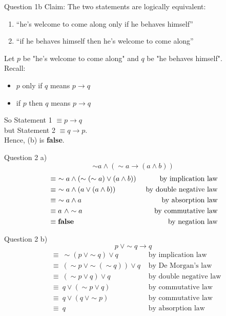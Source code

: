 \documentclass[10pt]{beamer}
\begin{document}
\begin{frame}[fragile]{Question 1b}
    Claim: The two statements are logically equivalent:
    \begin{enumerate}
        \item “he’s welcome to come along only if he behaves himself”
        \item “if he behaves himself then he’s welcome to come along”
    \end{enumerate}
    Let $p$ be "he's welcome to come along" and $q$ be "he behaves himself". \\
    Recall:
    \begin{itemize}
        \item $p$ only if $q$ means $p \rightarrow q$
        \item if $p$ then $q$ means $p \rightarrow q$
    \end{itemize}
    So Statement 1 $\equiv p \rightarrow q$ \\
    but Statement 2 $\equiv q \rightarrow p$. \\
    Hence, (b) is \textbf{false}.
\end{frame}

\begin{frame}[fragile]{Question 2}
a) $$\sim a \land ( \sim a \rightarrow (a \land b))$$
    \begin{align*}
        &\equiv \ \sim a \land ( \sim (\sim a) \lor (a \land b)) &\text{ by implication law} \\
        &\equiv \ \sim a \land ( a \lor (a \land b)) &\text{ by double negative law} \\
        &\equiv \ \sim a \land a &\text{ by absorption law} \\
        &\equiv a \ \land \sim a &\text{ by commutative law} \\
        &\equiv \text{\textbf{false}} &\text{ by negation law} 
    \end{align*}
\end{frame}

\begin{frame}[fragile]{Question 2}
b)
\[p \ \lor \sim q \rightarrow q \]
    \begin{align*}
        &\equiv \ \sim (p \ \lor \sim q) \lor q &\text{ by implication law} \\
        &\equiv \ (\sim p \ \lor \sim (\sim q)) \lor q &\text{ by De Morgan's law} \\
        &\equiv \ (\sim p \lor q) \lor q &\text{ by double negative law} \\
        &\equiv \ q \lor (\sim p \lor q) &\text{ by commutative law} \\
        &\equiv \ q \lor (q \ \lor \sim p) &\text{ by commutative law} \\
        &\equiv \ q &\text{ by absorption law}
    \end{align*}
\end{frame}
\end{document}
